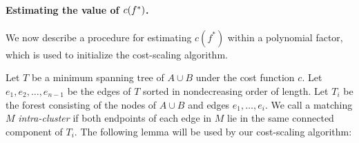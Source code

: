 \documentclass[11pt]{article}
\def\cost{c}
\numberwithin{figure}{section}
\def\EMPH#1{\textcolor{BrickRed}{{\emph{#1}}}}
\begin{document}
\paragraph*{Estimating the value of \textbf{$\boldmath \cost(f^*)$}.}
We now describe a procedure for estimating $\cost(f^*)$ within a polynomial factor,
which is used to initialize the cost-scaling algorithm.

Let \EMPH{$T$} be a minimum spanning tree of $A \cup B$ under the cost function $c$.
Let $e_1, e_2, \ldots, e_{n-1}$ be the edges of $T$ sorted in nondecreasing order
of length.
Let \EMPH{$T_i$} be the forest consisting of the nodes of $A \cup B$ and
edges $e_1, \ldots, e_i$.
We call a matching $M$ \EMPH{intra-cluster} if both endpoints of
each edge in $M$ lie in the same connected component of $T_i$.
%
The following lemma will be used by our cost-scaling algorithm:
\end{document}
